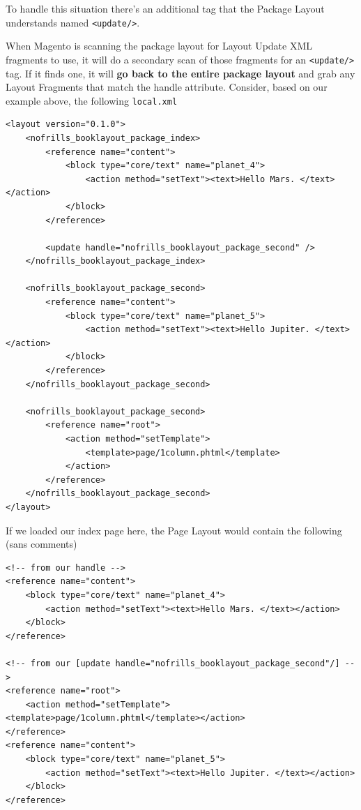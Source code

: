 \documentclass[oneside]{book}
\begin{document}
To handle this situation there's an additional tag that the Package Layout understands named \footnotesize\texttt{\textless update/\textgreater }\normalsize.

When Magento is scanning the package layout for Layout Update XML fragments to use, it will do a secondary scan of those fragments for an \footnotesize\texttt{\textless update/\textgreater } \normalsize  tag.  If it finds one, it will \textbf{go back to the entire package layout} and grab any Layout Fragments that match the handle attribute.  Consider, based on our example above, the following \footnotesize\texttt{local.xml} \normalsize

\begin{lstlisting}
<layout version="0.1.0">
    <nofrills_booklayout_package_index>
        <reference name="content">
            <block type="core/text" name="planet_4">
                <action method="setText"><text>Hello Mars. </text></action>
            </block>
        </reference>

        <update handle="nofrills_booklayout_package_second" />
    </nofrills_booklayout_package_index>

    <nofrills_booklayout_package_second>
        <reference name="content">
            <block type="core/text" name="planet_5">
                <action method="setText"><text>Hello Jupiter. </text></action>
            </block>
        </reference>
    </nofrills_booklayout_package_second>

    <nofrills_booklayout_package_second>
        <reference name="root">
            <action method="setTemplate">
                <template>page/1column.phtml</template>
            </action>
        </reference>
    </nofrills_booklayout_package_second>
</layout>

\end{lstlisting}


If we loaded our index page here, the Page Layout would contain the following (sans comments)

\begin{lstlisting}
<!-- from our handle -->
<reference name="content">
    <block type="core/text" name="planet_4">
        <action method="setText"><text>Hello Mars. </text></action>
    </block>
</reference>

<!-- from our [update handle="nofrills_booklayout_package_second"/] -->
<reference name="root">
    <action method="setTemplate"><template>page/1column.phtml</template></action>
</reference>
<reference name="content">
    <block type="core/text" name="planet_5">
        <action method="setText"><text>Hello Jupiter. </text></action>
    </block>
</reference>

\end{lstlisting}
\end{document}
